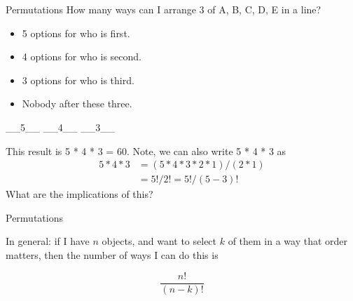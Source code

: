 \documentclass[aspectratio=169]{../latex_main/tntbeamer}  %
\begin{document}
	\begin{frame}{Permutations}
	    How many ways can I arrange 3 of {A, B, C, D, E} in a line?

	    \begin{itemize}
	        \item 5 options for who is first.
	        \item 4 options for who is second.
	        \item 3 options for who is third.
	        \item Nobody after these three.
	    \end{itemize}

	      \hspace{4cm} \_\_5\_\_ \hspace{2cm}		\_\_4\_\_ \hspace{2cm}		\_\_3\_\_ 

       This result is 5 * 4 * 3 = 60. Note, we can also write 5 * 4 * 3 as\\
        \begin{align*}
            5 * 4 * 3 &= (5 * 4 * 3 * 2 * 1) / (2 * 1) \\
            &= 5! / 2! = 5! / (5 - 3)!
        \end{align*}
    What are the implications of this?
	\end{frame}
	
	
	\begin{frame}{Permutations}
 
	    In general: if I have $n$ objects, and want to select $k$ of them in a way that order matters, then the number of ways I can do this is

	    \begin{equation*}
	        \frac{n!}{(n-k)!}
	    \end{equation*}

	\end{frame}
	
\end{document}
